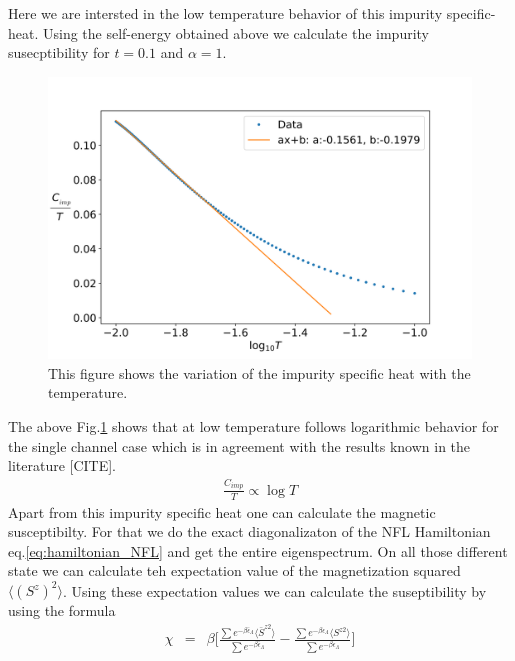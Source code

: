 \documentclass[reprint,prb,superscriptaddress]{revtex4-2}
\begin{document}
Here we are intersted in the low temperature behavior of this impurity specific-heat. Using the self-energy obtained above we calculate the impurity susecptibility for $t=0.1$ and $\alpha=1$. 
\begin{figure}
\centering
\includegraphics[scale=0.36]{plt/FINAL_fitted_Cv_t_0p1.png}
\caption{This figure shows the variation of the impurity specific heat with the temperature.}
\label{fig:Cv_imp}
\end{figure}
The above Fig.\ref{fig:Cv_imp} shows that at low temperature follows logarithmic behavior for the single channel case which is in agreement with the results known in the literature [CITE].
\begin{eqnarray}
\frac{C_{imp}}{T} \propto \log T
\end{eqnarray}
Apart from this impurity specific heat one can calculate the magnetic susceptibilty. For that we do the exact diagonalizaton of the NFL Hamiltonian eq.\eqref{eq:hamiltonian_NFL} and get the entire eigenspectrum. On all those different state we can calculate teh expectation value of the magnetization squared $\langle (S^z)^2 \rangle$. Using these expectation values we can calculate the suseptibility by using the formula
\begin{eqnarray}
\chi &=& \beta\bigg[\frac{\sum e^{-\beta \bar{\epsilon}_{\Lambda}} \langle \bar{S}^{z2} \rangle}{\sum e^{-\beta \bar{\epsilon}_{\Lambda}} } -\frac{\sum e^{-\beta \epsilon_{\Lambda}} \langle S^{z2 }\rangle }{\sum e^{-\beta \epsilon_{\Lambda}} } \bigg] 
\end{eqnarray}
\end{document}
